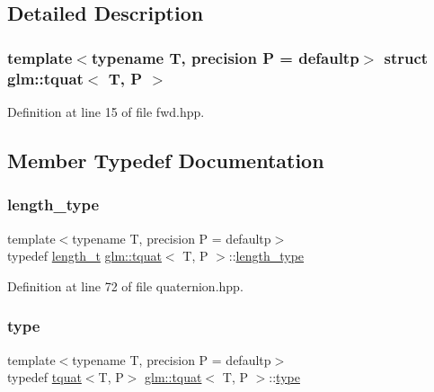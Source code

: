 \subsection{Detailed Description}
\subsubsection*{template$<$typename T, precision P = defaultp$>$\newline
struct glm\+::tquat$<$ T, P $>$}



Definition at line 15 of file fwd.\+hpp.



\subsection{Member Typedef Documentation}
\mbox{\label{structglm_1_1tquat_ab3ef67a20d129dcb01f042042218ba17}} 
\subsubsection{\texorpdfstring{length\_type}{length\_type}}
{\footnotesize\ttfamily template$<$typename T, precision P = defaultp$>$ \\
typedef \mbox{\hyperlink{namespaceglm_a090a0de2260835bee80e71a702492ed9}{length\+\_\+t}} \mbox{\hyperlink{structglm_1_1tquat}{glm\+::tquat}}$<$ T, P $>$\+::\mbox{\hyperlink{structglm_1_1tquat_ab3ef67a20d129dcb01f042042218ba17}{length\+\_\+type}}}



Definition at line 72 of file quaternion.\+hpp.

\mbox{\label{structglm_1_1tquat_a5a7bf29e6af38b1b79e9f553fd85f3ec}} 
\subsubsection{\texorpdfstring{type}{type}}
{\footnotesize\ttfamily template$<$typename T, precision P = defaultp$>$ \\
typedef \mbox{\hyperlink{structglm_1_1tquat}{tquat}}$<$T, P$>$ \mbox{\hyperlink{structglm_1_1tquat}{glm\+::tquat}}$<$ T, P $>$\+::\mbox{\hyperlink{structglm_1_1tquat_a5a7bf29e6af38b1b79e9f553fd85f3ec}{type}}}



